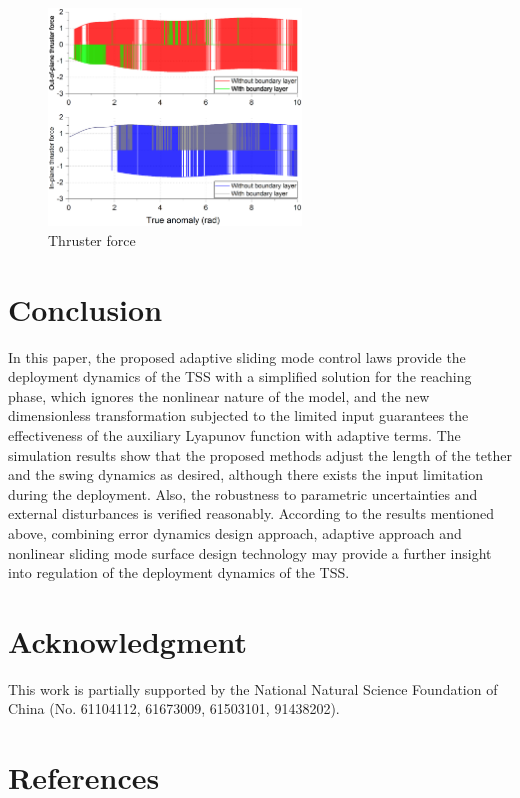 \documentclass[3p]{elsarticle}
\theoremstyle{plain}
\theoremstyle{remark}
\begin{document}
\begin{figure}
\centering
\includegraphics[width=0.6\textwidth]{paper4_response_20161230.eps}
\caption{Thruster force}
\label{fig:11}
\end{figure}
\section{Conclusion}\label{sec:5}
In this paper, the proposed adaptive sliding mode control laws provide the deployment dynamics of the TSS with a simplified solution for the reaching phase, which ignores the nonlinear nature of the model, and the new dimensionless transformation subjected to the limited input guarantees the effectiveness of the auxiliary Lyapunov function with adaptive terms. The simulation results show that the proposed methods adjust the length of the tether and the swing dynamics as desired, although there exists the input limitation during the deployment. Also, the robustness to parametric uncertainties and external disturbances is verified reasonably. According to the results mentioned above, combining error dynamics design approach, adaptive approach and nonlinear sliding mode surface design technology may provide a further insight into regulation of the deployment dynamics of the TSS.
\section{Acknowledgment}
This work is partially supported by the National Natural Science Foundation of China (No. 61104112, 61673009, 61503101, 91438202).
\section{References}


\end{document}
